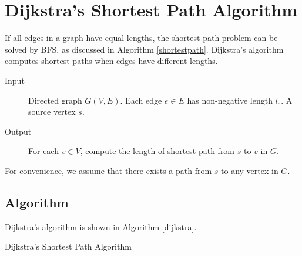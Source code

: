 \section{Dijkstra's Shortest Path Algorithm}
If all edges in a graph have equal lengths, the shortest path problem can be solved by BFS, as discussed in Algorithm \ref{shortestpath}. Dijkstra's algorithm computes shortest paths when edges have different lengths.
\begin{description}
\item[Input]Directed graph $G(V,E)$. Each edge $e\in E$ has non-negative length $l_e$. A source vertex $s$.
\item[Output]For each $v\in V$, compute the length of shortest path from $s$ to $v$ in $G$.
\end{description}
For convenience, we assume that there exists a path from $s$ to any vertex in $G$. 
\subsection{Algorithm}
Dijkstra's algorithm is shown in Algorithm \ref{dijkstra}.
\begin{algorithm}[ht]
\caption{Dijkstra's Shortest Path Algorithm}\label{dijkstra}
\begin{algorithmic}[1]
\Input{}
\Output{}
\EndWhile
\end{algorithmic}
\end{algorithm}
